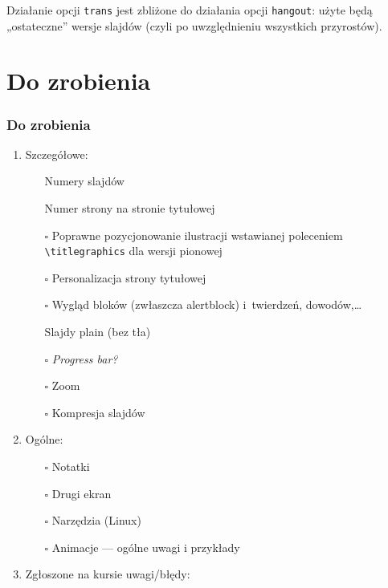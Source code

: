 \documentclass[12pt,aspectratio=169,ignorenonframetext]{beamer}
\newcommand{\cmark}{\ding{51}}%
\newcommand{\done}{\rlap{$\square$}{\raisebox{2pt}{\large\hspace{1pt}\cmark}}%
 \hspace{-2.5pt}}
\newcommand{\emptybox}{$\square$}
\begin{document}
Działanie opcji \lstinline|trans| jest zbliżone do działania opcji \lstinline|hangout|: użyte będą „ostateczne” wersje slajdów (czyli po uwzględnieniu wszystkich przyrostów).



\section{Do zrobienia}

\begin{frame}
 \frametitle<presentation>{Do zrobienia}
 \begin{enumerate}
  \item
        Szczegółowe:
        \begin{itemize}
         \item[\done]
               Numery slajdów
         \item[\done]
               Numer strony na stronie tytułowej
         \item[\emptybox]
               Poprawne pozycjonowanie ilustracji wstawianej poleceniem \lstinline|\titlegraphics| dla wersji pionowej
         \item[\emptybox]
               Personalizacja strony tytułowej
         \item[\emptybox]
               Wygląd bloków (zwłaszcza alertblock) i~twierdzeń, dowodów,… %
         \item[\done]
               Slajdy plain (bez tła)
         \item[\emptybox]
               \emph{Progress bar?}
               \item [\emptybox] Zoom
               \item [\emptybox] Kompresja slajdów
        \end{itemize}
  \item Ogólne:
        \begin{itemize}
         \item[\emptybox]
               Notatki
         \item[\emptybox]
               Drugi ekran
         \item[\emptybox]
               Narzędzia (Linux)
               \item[\emptybox] 
               Animacje — ogólne uwagi i przykłady
        \end{itemize}
  \item Zgłoszone na kursie uwagi/błędy:

\end{enumerate}
\end{frame}
\end{document}
